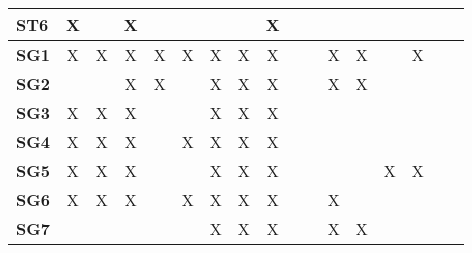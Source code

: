 \documentclass[12pt]{article}
\begin{document}
\begin{table}[H]
\begin{adjustwidth}{-0.1in}{-1in}
{\begin{tabular}{c|c|c|c|c|c|c|c|c|c|c|c|c|c|c|c|c|}
\multicolumn{1}{|l|}{\textbf{ST6}}   &      X       &              &       X      &              &              &              &              &       X      &              &              &              &              &              &              &              &               \\ \hline
\multicolumn{1}{|l|}{\textbf{SG1}}   &      X       &      X       &       X      &       X      &       X      &      X       &       X      &       X      &              &              &      X       &      X       &              &      X       &              &               \\ \hline
\multicolumn{1}{|l|}{\textbf{SG2}}   &              &              &       X      &       X       &             &      X       &       X      &       X      &              &              &      X       &     X        &              &              &              &               \\ \hline
\multicolumn{1}{|l|}{\textbf{SG3}}   &      X       &      X       &       X      &              &              &      X       &       X      &       X      &              &              &              &              &              &              &              &               \\ \hline
\multicolumn{1}{|l|}{\textbf{SG4}}   &      X       &      X       &       X      &              &       X      &      X       &       X      &       X      &              &              &              &              &              &              &              &               \\ \hline
\multicolumn{1}{|l|}{\textbf{SG5}}   &      X       &      X       &       X      &              &              &      X       &       X      &       X      &              &              &              &              &       X      &       X      &              &               \\ \hline
\multicolumn{1}{|l|}{\textbf{SG6}}   &      X       &      X       &       X      &              &       X      &      X       &       X      &       X      &              &              &       X      &              &              &              &              &               \\ \hline
\multicolumn{1}{|l|}{\textbf{SG7}}   &              &              &              &              &              &      X       &       X      &       X      &              &              &       X      &       X      &              &              &              &               \\ \hline

\end{tabular}}
\end{adjustwidth}
\end{table}
\end{document}
